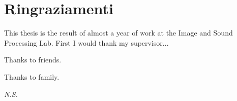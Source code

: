 \chapter{Ringraziamenti}
\label{Ringraziamenti}
\thispagestyle{empty}

\vspace{0.5cm}
This thesis is the result of almost a year of work at the Image and Sound Processing Lab.
First I would thank my supervisor...

\vspace{0.5cm}
Thanks to friends.

\vspace{0.5cm}
Thanks to family.

\vspace{1cm}
\begin{flushright}
\textit{N.S.}
\end{flushright}